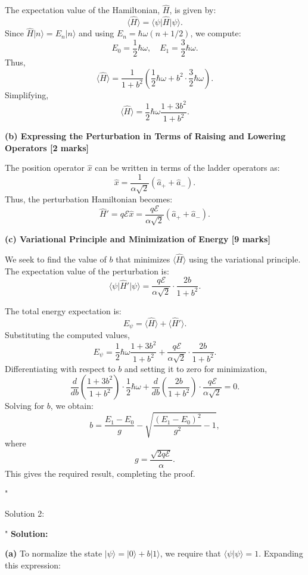The expectation value of the Hamiltonian, \( \hat{H} \), is given by:
\[
\langle \hat{H} \rangle = \langle \psi \vert \hat{H} \vert \psi \rangle.
\]
Since \( \hat{H} \vert n \rangle = E_n \vert n \rangle \) and using \( E_n = \hbar \omega (n + 1/2) \), we compute:
\[
E_0 = \frac{1}{2} \hbar \omega, \quad E_1 = \frac{3}{2} \hbar \omega.
\]
Thus,
\[
\langle \hat{H} \rangle = \frac{1}{1 + b^2} \left( \frac{1}{2} \hbar \omega + b^2 \cdot \frac{3}{2} \hbar \omega \right).
\]
Simplifying,
\[
\langle \hat{H} \rangle = \frac{1}{2} \hbar \omega \frac{1 + 3b^2}{1 + b^2}.
\]

\textbf{(b) Expressing the Perturbation in Terms of Raising and Lowering Operators [2 marks]}

The position operator \( \hat{x} \) can be written in terms of the ladder operators as:
\[
\hat{x} = \frac{1}{\alpha \sqrt{2}} (\hat{a}_+ + \hat{a}_-).
\]
Thus, the perturbation Hamiltonian becomes:
\[
\hat{H}' = q\mathcal{E} \hat{x} = \frac{q\mathcal{E}}{\alpha \sqrt{2}} (\hat{a}_+ + \hat{a}_-).
\]

\textbf{(c) Variational Principle and Minimization of Energy [9 marks]}

We seek to find the value of \( b \) that minimizes \( \langle \hat{H} \rangle \) using the variational principle. The expectation value of the perturbation is:
\[
\langle \psi \vert \hat{H}' \vert \psi \rangle = \frac{q\mathcal{E}}{\alpha \sqrt{2}} \cdot \frac{2b}{1 + b^2}.
\]

The total energy expectation is:
\[
E_{\psi} = \langle \hat{H} \rangle + \langle \hat{H}' \rangle.
\]
Substituting the computed values,
\[
E_{\psi} = \frac{1}{2} \hbar \omega \frac{1 + 3b^2}{1 + b^2} + \frac{q\mathcal{E}}{\alpha \sqrt{2}} \cdot \frac{2b}{1 + b^2}.
\]
Differentiating with respect to \( b \) and setting it to zero for minimization,
\[
\frac{d}{db} \left( \frac{1 + 3b^2}{1 + b^2} \right) \cdot \frac{1}{2} \hbar \omega + \frac{d}{db} \left( \frac{2b}{1 + b^2} \right) \cdot \frac{q\mathcal{E}}{\alpha \sqrt{2}} = 0.
\]
Solving for \( b \), we obtain:
\[
 b = \frac{E_1 - E_0}{g} - \sqrt{\frac{(E_1 - E_0)^2}{g^2} - 1},
\]
where
\[
 g = \frac{\sqrt{2q\mathcal{E}}}{\alpha}.
\]
This gives the required result, completing the proof.

"

Solution 2: 

"
\textbf{Solution:}

\textbf{(a)} To normalize the state \(|\psi\rangle = |0\rangle + b|1\rangle\), we require that \(\langle \psi | \psi \rangle = 1\). Expanding this expression:

